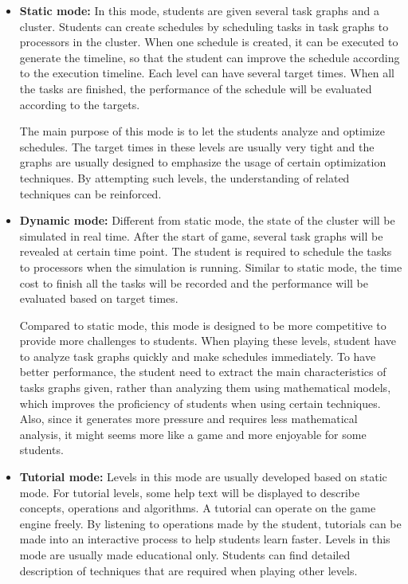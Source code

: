 \documentclass[msc,deptreport, cs]{infthesis}
\begin{document}
\begin{itemize}
  \item \textbf{Static mode:} In this mode, students are given several task graphs and a cluster. Students can create schedules by scheduling tasks in task graphs to processors in the cluster. When one schedule is created, it can be executed to generate the timeline, so that the student can improve the schedule according to the execution timeline. Each level can have several target times. When all the tasks are finished, the performance of the schedule will be evaluated according to the targets.
  
  The main purpose of this mode is to let the students analyze and optimize schedules. The target times in these levels are usually very tight and the graphs are usually designed to emphasize the usage of certain optimization techniques. By attempting such levels, the understanding of related techniques can be reinforced.

  \item \textbf{Dynamic mode:} Different from static mode, the state of the cluster will be simulated in real time. After the start of game, several task graphs will be revealed at certain time point. The student is required to schedule the tasks to processors when the simulation is running. Similar to static mode, the time cost to finish all the tasks will be recorded and the performance will be evaluated based on target times.
  
  Compared to static mode, this mode is designed to be more competitive to provide more challenges to students. When playing these levels, student have to analyze task graphs quickly and make schedules immediately. To have better performance, the student need to extract the main characteristics of tasks graphs given, rather than analyzing them using mathematical models, which improves the proficiency of students when using certain techniques. Also, since it generates more pressure and requires less mathematical analysis, it might seems more like a game and more enjoyable for some students.

  \item \textbf{Tutorial mode:} Levels in this mode are usually developed based on static mode. For tutorial levels, some help text will be displayed to describe concepts, operations and algorithms. A tutorial can operate on the game engine freely. By listening to operations made by the student, tutorials can be made into an interactive process to help students learn faster. Levels in this mode are usually made educational only. Students can find detailed description of techniques that are required when playing other levels.


\end{itemize}
\end{document}
